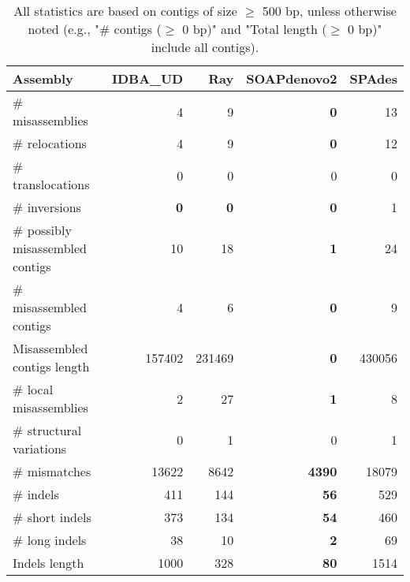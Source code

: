 \documentclass[12pt,a4paper]{article}
\begin{document}
\begin{table}[ht]
\begin{center}
\caption{All statistics are based on contigs of size $\geq$ 500 bp, unless otherwise noted (e.g., "\# contigs ($\geq$ 0 bp)" and "Total length ($\geq$ 0 bp)" include all contigs).}
\begin{tabular}{|l*{4}{|r}|}
\hline
Assembly & IDBA\_UD & Ray & SOAPdenovo2 & SPAdes \\ \hline
\# misassemblies & 4 & 9 & {\bf 0} & 13 \\ \hline
\hspace{5mm}\# relocations & 4 & 9 & {\bf 0} & 12 \\ \hline
\hspace{5mm}\# translocations & 0 & 0 & 0 & 0 \\ \hline
\hspace{5mm}\# inversions & {\bf 0} & {\bf 0} & {\bf 0} & 1 \\ \hline
\# possibly misassembled contigs & 10 & 18 & {\bf 1} & 24 \\ \hline
\# misassembled contigs & 4 & 6 & {\bf 0} & 9 \\ \hline
Misassembled contigs length & 157402 & 231469 & {\bf 0} & 430056 \\ \hline
\# local misassemblies & 2 & 27 & {\bf 1} & 8 \\ \hline
\# structural variations & 0 & 1 & 0 & 1 \\ \hline
\# mismatches & 13622 & 8642 & {\bf 4390} & 18079 \\ \hline
\# indels & 411 & 144 & {\bf 56} & 529 \\ \hline
\hspace{5mm}\# short indels & 373 & 134 & {\bf 54} & 460 \\ \hline
\hspace{5mm}\# long indels & 38 & 10 & {\bf 2} & 69 \\ \hline
Indels length & 1000 & 328 & {\bf 80} & 1514 \\ \hline
\end{tabular}
\end{center}
\end{table}
\end{document}
